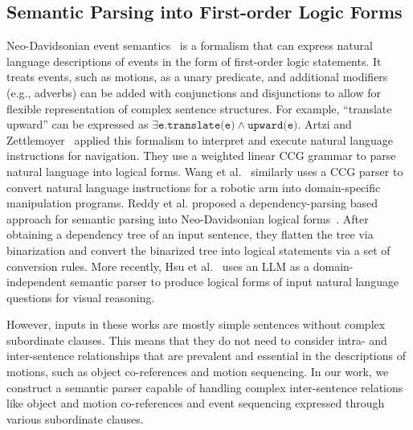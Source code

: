 \subsection{Semantic Parsing into First-order Logic Forms}
Neo-Davidsonian event semantics~\cite{parsons1990events,
davidson2001logical} is a formalism that can express natural language descriptions of events in the form of first-order logic statements.
It treats events, such as motions, as a unary predicate, and additional modifiers (e.g., adverbs) can be added with conjunctions and disjunctions to allow for flexible representation of complex sentence structures.
For example, ``translate upward'' can be expressed as $\exists \texttt{e.} \texttt{translate(e)} \land \texttt{upward(e)}$.
Artzi and Zettlemoyer~ applied this formalism to interpret and execute natural language instructions for navigation.
They use a weighted linear CCG grammar to parse natural language into logical forms. 
Wang et al.~ similarly uses a CCG parser to convert natural language instructions for a robotic arm into domain-specific manipulation programs.
Reddy et al. proposed a dependency-parsing based approach for semantic parsing into Neo-Davidsonian logical forms~\cite{reddy2016transforming}.
After obtaining a dependency tree of an input sentence, they flatten the tree via binarization and convert the binarized tree into logical statements via a set of conversion rules.
More recently, Hsu et al.~\cite{hsu2024left} uses an LLM as a domain-independent semantic parser to produce logical forms of input natural language questions for visual reasoning.

However, inputs in these works are mostly simple sentences without complex subordinate clauses.
This means that they do not need to consider intra- and inter-sentence relationships that are prevalent and essential in the descriptions of motions, such as object co-references and motion sequencing.
%
In our work, we construct a semantic parser capable of handling complex inter-sentence relations like object and motion co-references and event sequencing expressed through various subordinate clauses.


